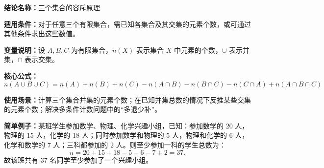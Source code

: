 \textbf{结论名称：}三个集合的容斥原理

\textbf{适用条件：}对于任意三个有限集合，需已知各集合及其交集的元素个数，或可通过其他条件求出这些数值。

\textbf{变量说明：}设 \(A, B, C\) 为有限集合，\(n(X)\) 表示集合 \(X\) 中元素的个数，\(\cup\) 表示并集，\(\cap\) 表示交集。

\textbf{核心公式：}
\[
\boxed{n(A \cup B \cup C) = n(A) + n(B) + n(C) - n(A \cap B) - n(B \cap C) - n(C \cap A) + n(A \cap B \cap C)}
\]

\textbf{使用场景：}计算三个集合并集的元素个数；在已知并集总数的情况下反推某些交集的元素个数；解决多条件计数问题中的“多退少补”。

\textbf{简单例子：}某班学生参加数学、物理、化学兴趣小组，已知：参加数学的 20 人，物理的 15 人，化学的 18 人；同时参加数学和物理的 5 人，物理和化学的 6 人，化学和数学的 7 人；三科都参加的 2 人。则至少参加一科的学生总数为：
\[
n = 20 + 15 + 18 - 5 - 6 - 7 + 2 = 37.
\]
故该班共有 37 名同学至少参加了一个兴趣小组。